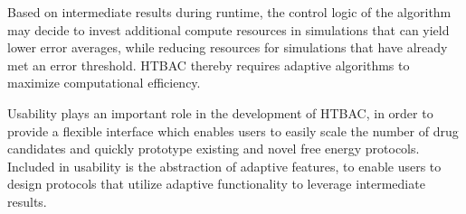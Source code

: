 



Based on intermediate results during runtime, the control logic of the
algorithm  may decide to invest additional compute resources in 
simulations that can yield lower error averages, while
reducing resources for simulations that have already met an error threshold.
HTBAC thereby requires %
adaptive algorithms to maximize computational efficiency.


Usability plays an important role in the development of HTBAC, in order to
provide a flexible interface which enables users to easily scale the number
of drug candidates and quickly prototype existing and novel free energy
protocols. Included in usability is the abstraction of adaptive features, to
enable users to design protocols that utilize adaptive functionality to
leverage intermediate results.

